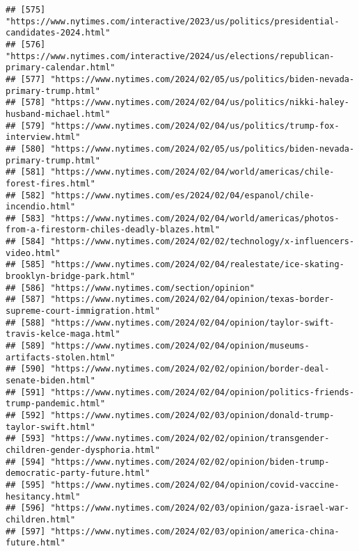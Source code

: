 \documentclass[
]{article}
\begin{document}
\begin{verbatim}
## [575] "https://www.nytimes.com/interactive/2023/us/politics/presidential-candidates-2024.html"                    
## [576] "https://www.nytimes.com/interactive/2024/us/elections/republican-primary-calendar.html"                    
## [577] "https://www.nytimes.com/2024/02/05/us/politics/biden-nevada-primary-trump.html"                            
## [578] "https://www.nytimes.com/2024/02/04/us/politics/nikki-haley-husband-michael.html"                           
## [579] "https://www.nytimes.com/2024/02/04/us/politics/trump-fox-interview.html"                                   
## [580] "https://www.nytimes.com/2024/02/05/us/politics/biden-nevada-primary-trump.html"                            
## [581] "https://www.nytimes.com/2024/02/04/world/americas/chile-forest-fires.html"                                 
## [582] "https://www.nytimes.com/es/2024/02/04/espanol/chile-incendio.html"                                         
## [583] "https://www.nytimes.com/2024/02/04/world/americas/photos-from-a-firestorm-chiles-deadly-blazes.html"       
## [584] "https://www.nytimes.com/2024/02/02/technology/x-influencers-video.html"                                    
## [585] "https://www.nytimes.com/2024/02/04/realestate/ice-skating-brooklyn-bridge-park.html"                       
## [586] "https://www.nytimes.com/section/opinion"                                                                   
## [587] "https://www.nytimes.com/2024/02/04/opinion/texas-border-supreme-court-immigration.html"                    
## [588] "https://www.nytimes.com/2024/02/04/opinion/taylor-swift-travis-kelce-maga.html"                            
## [589] "https://www.nytimes.com/2024/02/04/opinion/museums-artifacts-stolen.html"                                  
## [590] "https://www.nytimes.com/2024/02/02/opinion/border-deal-senate-biden.html"                                  
## [591] "https://www.nytimes.com/2024/02/04/opinion/politics-friends-trump-pandemic.html"                           
## [592] "https://www.nytimes.com/2024/02/03/opinion/donald-trump-taylor-swift.html"                                 
## [593] "https://www.nytimes.com/2024/02/02/opinion/transgender-children-gender-dysphoria.html"                     
## [594] "https://www.nytimes.com/2024/02/02/opinion/biden-trump-democratic-party-future.html"                       
## [595] "https://www.nytimes.com/2024/02/04/opinion/covid-vaccine-hesitancy.html"                                   
## [596] "https://www.nytimes.com/2024/02/03/opinion/gaza-israel-war-children.html"                                  
## [597] "https://www.nytimes.com/2024/02/03/opinion/america-china-future.html"                                      

\end{verbatim}
\end{document}
